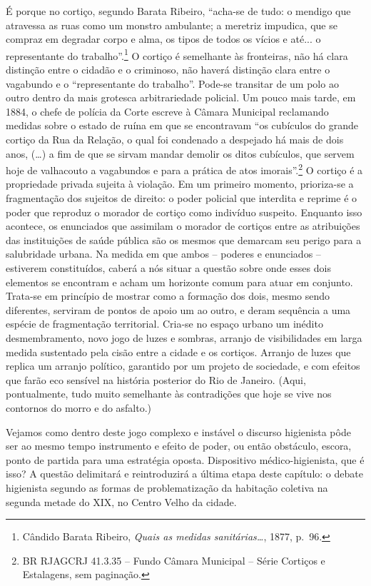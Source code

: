 É porque no cortiço, segundo Barata Ribeiro, ``acha-se de tudo: o
mendigo que atravessa as ruas como um monstro ambulante; a meretriz
impudica, que se compraz em degradar corpo e alma, os tipos de todos os
vícios e até... o representante do trabalho''.\footnote{Cândido Barata
  Ribeiro, \emph{Quais as medidas sanitárias\ldots{}}, 1877, p.~96.} O
cortiço é semelhante às fronteiras, não há clara distinção entre o
cidadão e o criminoso, não haverá distinção clara entre o vagabundo e o
``representante do trabalho''. Pode-se transitar de um polo ao outro
dentro da mais grotesca arbitrariedade policial. Um pouco mais tarde, em
1884, o chefe de polícia da Corte escreve à Câmara Municipal reclamando
medidas sobre o estado de ruína em que se encontravam ``os cubículos do
grande cortiço da Rua da Relação, o qual foi condenado a despejado há
mais de dois anos, (\ldots{}) a fim de que se sirvam mandar demolir os
ditos cubículos, que servem hoje de valhacouto a vagabundos e para a
prática de atos imorais''.\footnote{BR RJAGCRJ 41.3.35 -- Fundo Câmara
  Municipal -- Série Cortiços e Estalagens, sem paginação.} O cortiço é
a propriedade privada sujeita à violação. Em um primeiro momento,
prioriza-se a fragmentação dos sujeitos de direito: o poder policial que
interdita e reprime é o poder que reproduz o morador de cortiço como
indivíduo suspeito. Enquanto isso acontece, os enunciados que assimilam
o morador de cortiços entre as atribuições das instituições de saúde
pública são os mesmos que demarcam seu perigo para a salubridade urbana.
Na medida em que ambos -- poderes e enunciados -- estiverem
constituídos, caberá a nós situar a questão sobre onde esses dois
elementos se encontram e acham um horizonte comum para atuar em
conjunto. Trata-se em princípio de mostrar como a formação dos dois,
mesmo sendo diferentes, serviram de pontos de apoio um ao outro, e deram
sequência a uma espécie de fragmentação territorial. Cria-se no espaço
urbano um inédito desmembramento, novo jogo de luzes e sombras, arranjo
de visibilidades em larga medida sustentado pela cisão entre a cidade e
os cortiços. Arranjo de luzes que replica um arranjo político, garantido
por um projeto de sociedade, e com efeitos que farão eco sensível na
história posterior do Rio de Janeiro. (Aqui, pontualmente, tudo muito
semelhante às contradições que hoje se vive nos contornos do morro e do
asfalto.)

Vejamos como dentro deste jogo complexo e instável o discurso higienista
pôde ser ao mesmo tempo instrumento e efeito de poder, ou então
obstáculo, escora, ponto de partida para uma estratégia oposta.
Dispositivo médico-higienista, que é isso? A questão delimitará e
reintroduzirá a última etapa deste capítulo: o debate higienista segundo
as formas de problematização da habitação coletiva na segunda metade do
XIX, no Centro Velho da cidade.

